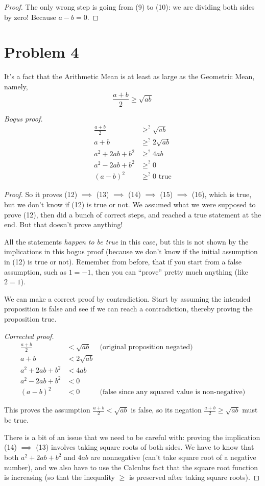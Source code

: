 \documentclass[14pt]{extarticle}
\begin{document}
\begin{proof}
The only wrong step is going from (9) to (10): we are dividing both sides by zero! Because $a - b= 0$.
\end{proof}

\section{Problem 4}

It’s a fact that the Arithmetic Mean is at least as large as the Geometric Mean, namely,
$$
\frac{a+b}{2} \geq \sqrt{ab}
$$

{\it Bogus proof.}
\begin{align}
\frac{a+b}{2} &\geq^?\sqrt{ab}  \\
a+b &\geq^? 2\sqrt{ab} \\
a^2+2ab+b^2 &\geq^? 4ab\\
a^2-2ab+b^2 &\geq^? 0\\
(a-b)^2 &\geq^? 0 \text{ true}
\end{align}

\begin{proof}
So it proves (12) $ \implies $ (13) $ \implies $ (14) $ \implies $ (15) $ \implies $ (16), which is true, but we don't know if (12) is true or not. We assumed what we were supposed to prove (12), then did a bunch of correct steps, and reached a true statement at the end. But that doesn't prove anything! 

All the statements \textit{happen to be true} in this case, but this is not shown by the implications in this bogus proof (because we don't know if the initial assumption in (12) is true or not). Remember from before, that if you start from a false assumption, such as $1 = -1$, then you can ``prove'' pretty much anything (like $2 = 1$).

We can make a correct proof by contradiction. Start by assuming the intended proposition is false and see if we can reach a contradiction, thereby proving the proposition true.

{\it Corrected proof.}
\begin{align}
  \frac{a+b}{2} &< \sqrt{ab} &\text{(original proposition negated)} \\
a+b &< 2\sqrt{ab} \\
a^2+2ab+b^2 &< 4ab\\
a^2-2ab+b^2 &< 0\\
  (a-b)^2 &< 0 &\text{(false since any squared value is non-negative)}
\end{align}

This proves the assumption $\frac{a+b}{2} < \sqrt{ab}$ is false, so its negation $\frac{a+b}{2} \geq \sqrt{ab}$ must be true.

There is a bit of an issue that we need to be careful with: proving the implication (14) $\implies$ (13) involves taking square roots of both sides. We have to know that both $a^2 + 2ab + b^2$ and $4ab$ are nonnegative (can't take square root of a negative number), and we also have to use the Calculus fact that the square root function is increasing (so that the inequality $\geq$ is preserved after taking square roots).
\end{proof}
\end{document}
